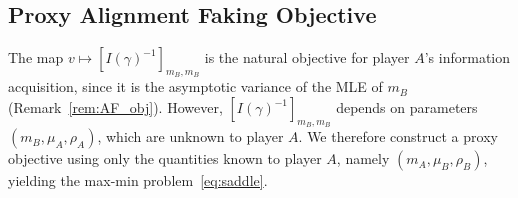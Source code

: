 \documentclass[letterpaper, 10 pt, conference]{ieeeconf}
\newcommand{\rh}[1]{\textcolor{purple}{\textsf{[RH: #1]}}}
\begin{document}
    
     


\subsection{Proxy Alignment Faking Objective}

The map $v \mapsto [I(\gamma)^{-1}]_{m_B,m_B}$ is the natural objective for player $A$'s information acquisition, since it is the asymptotic variance of the MLE of $m_B$ (Remark~\ref{rem:AF_obj}).  However, $[I(\gamma)^{-1}]_{m_B,m_B}$ depends on parameters $(m_B,\mu_A, \rho_A)$, which are unknown to player $A$. We therefore construct a proxy objective using only the quantities known to player \(A\), namely \((m_A,\mu_B,\rho_B)\), yielding the max-min problem~\eqref{eq:saddle}.
\end{document}
